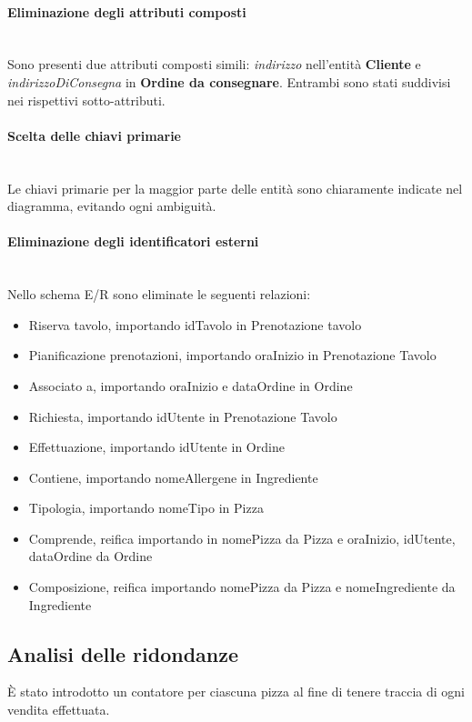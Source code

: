 \documentclass[a4paper,12pt, oneside]{article}
\begin{document}
\paragraph{Eliminazione degli attributi composti}
\hphantom{A}\\    %
Sono presenti due attributi composti simili: \textit{indirizzo}
nell'entità \textbf{Cliente} e \textit{indirizzoDiConsegna} in
\textbf{Ordine da consegnare}. Entrambi sono stati suddivisi
nei rispettivi sotto-attributi.

\paragraph{Scelta delle chiavi primarie}
\hphantom{A}\\    %
Le chiavi primarie per la maggior parte delle entità sono
chiaramente indicate nel diagramma, evitando ogni ambiguità.

\paragraph{Eliminazione degli identificatori esterni}
\hphantom{A}\\    %
Nello schema E/R sono eliminate le seguenti relazioni:
\begin{itemize}
    \item Riserva tavolo, importando idTavolo in Prenotazione tavolo
    \item Pianificazione prenotazioni, importando oraInizio in Prenotazione Tavolo
    \item Associato a, importando oraInizio e dataOrdine in Ordine
    \item Richiesta, importando idUtente in Prenotazione Tavolo
    \item Effettuazione, importando idUtente in Ordine
    \item Contiene, importando nomeAllergene in Ingrediente
    \item Tipologia, importando nomeTipo in Pizza
    \item Comprende, reifica importando in nomePizza da Pizza e oraInizio, idUtente, dataOrdine da Ordine
    \item Composizione, reifica importando nomePizza da Pizza e nomeIngrediente da Ingrediente
\end{itemize}

\subsection{Analisi delle ridondanze}
È stato introdotto un contatore per ciascuna pizza al
fine di tenere traccia di ogni vendita effettuata.
\end{document}
